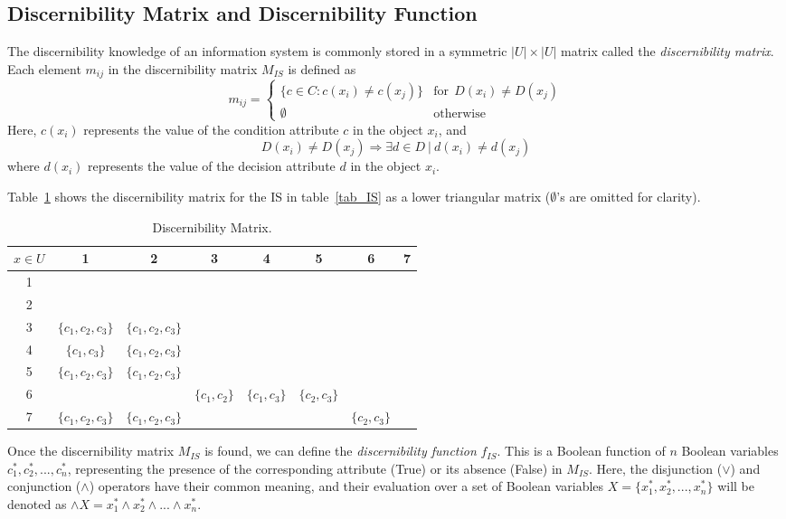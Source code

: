 \documentclass[citenumber]{llncs}
\begin{document}
\subsection{Discernibility Matrix and Discernibility Function}
  The discernibility knowledge of an information system is commonly stored in a symmetric $|U| \times |U|$
  matrix called the \textit{discernibility matrix}. Each element $m_{ij}$ in the discernibility matrix 
  $M_{IS}$ is defined as   
  \begin{equation}
  	m_{ij}=\left\lbrace\begin{array}{ll}
  			\lbrace c \in C: c(x_i) \neq c(x_j) \rbrace & \mathrm{for~~}D(x_i) \neq D(x_j)\\
  			\emptyset 								   & \mathrm{otherwise} 
  	\end{array}\right.
  \end{equation}  
  Here, $c(x_i)$ represents the value of the condition attribute $c$ in the object $x_i$, and 
  $$D(x_i) \neq D(x_j) \Rightarrow \exists d \in D~ |~ d(x_i) \neq d(x_j)$$ 
  where $d(x_i)$ represents the value  of the decision attribute $d$ in the object $x_i$.
  
  Table~\ref{tab_DM} shows the discernibility matrix for the IS in table~\ref{tab_IS} as a lower triangular 
  matrix ($\emptyset$'s are omitted for clarity).
  
   \begin{table}[htb]
		\caption{Discernibility Matrix.} \label{tab_DM}
		\centering
 	\begin{tabular}{c|ccccccc}
 		$x \in U$ & 1 & 2 &  3 & 4 & 5 &  6 & 7\\
 		\hline
		1 &&&&&&&\\
		2 &&&&&&&\\
		3 & $\lbrace c_1,c_2,c_3\rbrace$ & $\lbrace c_1,c_2,c_3\rbrace$ &&&&&\\
		4 & $\lbrace c_1,c_3\rbrace$ & $\lbrace c_1,c_2,c_3\rbrace$ &&&&&\\
		5 & $\lbrace c_1,c_2,c_3\rbrace$ & $\lbrace c_1,c_2,c_3\rbrace$ &&&&&\\
		6 &&& $\lbrace c_1,c_2\rbrace$ & $\lbrace c_1,c_3\rbrace$ & $\lbrace c_2,c_3\rbrace$ &&\\
		7 & $\lbrace c_1,c_2,c_3\rbrace$ & $\lbrace c_1,c_2,c_3\rbrace$ &&&& $\lbrace c_2,c_3\rbrace$ &\\
 	\end{tabular}             
 \end{table}
  
  Once the discernibility matrix $M_{IS}$ is found, we can define the \textit{discernibility function} $f_{IS}$. This is a Boolean function of $n$ Boolean variables $c_1^*, c_2^*,...,c_n^*$, representing the presence of the corresponding attribute (True) or its absence (False) in $M_{IS}$. Here, the disjunction ($\vee$) and conjunction ($\wedge$) operators have their common meaning, and their evaluation over a set of Boolean variables $X=\lbrace x_1^*, x_2^*, ..., x_n^* \rbrace$ will be denoted as $\wedge X= x_1^* \wedge x_2^* \wedge ... \wedge x_n^* $.
  
\end{document}

